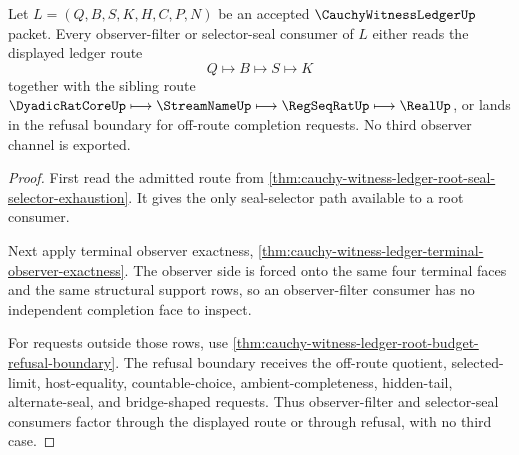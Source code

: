 \begin{theorem}
\label{thm:cauchy-witness-ledger-completion-observer-refusal-factorization}
Let $L=(Q,B,S,K,H,C,P,N)$ be an accepted $\CauchyWitnessLedgerUp$ packet. Every observer-filter or selector-seal consumer of $L$ either reads the displayed ledger route
$$
Q \longmapsto B \longmapsto S \longmapsto K
$$
together with the sibling route $\DyadicRatCoreUp \longmapsto \StreamNameUp \longmapsto \RegSeqRatUp \longmapsto \RealUp$, or lands in the refusal boundary for off-route completion requests. No third observer channel is exported.
\end{theorem}
\begin{proof}
First read the admitted route from \autoref{thm:cauchy-witness-ledger-root-seal-selector-exhaustion}. It gives the only seal-selector path available to a root consumer.

Next apply terminal observer exactness, \autoref{thm:cauchy-witness-ledger-terminal-observer-exactness}. The observer side is forced onto the same four terminal faces and the same structural support rows, so an observer-filter consumer has no independent completion face to inspect.

For requests outside those rows, use \autoref{thm:cauchy-witness-ledger-root-budget-refusal-boundary}. The refusal boundary receives the off-route quotient, selected-limit, host-equality, countable-choice, ambient-completeness, hidden-tail, alternate-seal, and bridge-shaped requests. Thus observer-filter and selector-seal consumers factor through the displayed route or through refusal, with no third case.
\end{proof}

